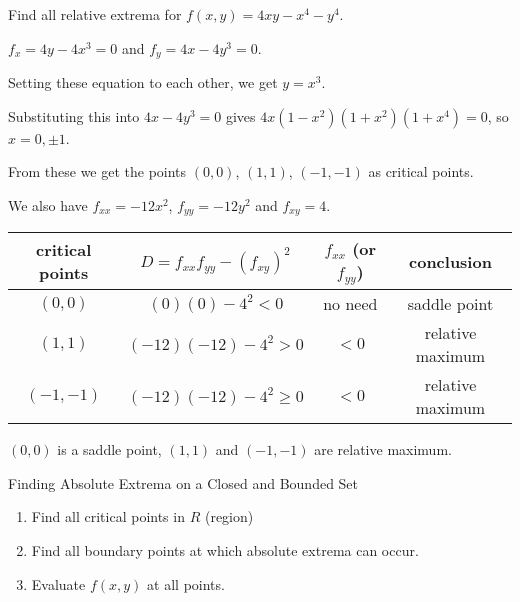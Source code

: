 \documentclass[../calc3.tex]{subfiles}
\begin{document}
\begin{example}
    Find all relative extrema for $f(x,y)=4xy-x^4-y^4$.

    $f_x=4y-4x^3=0$ and $f_y=4x-4y^3=0$.

    Setting these equation to each other, we get $y=x^3$.

    Substituting this into $4x-4y^3=0$ gives $4x(1-x^2)(1+x^2)(1+x^4)=0$, so $x=0, \pm 1$.

    From these we get the points $(0,0)$, $(1,1)$, $(-1,-1)$ as critical points.

    We also have $f_{xx}=-12x^2$, $f_{yy}=-12y^2$ and $f_{xy}=4$.
\begin{center}
    \begin{tabular}{c|c|c|c}
        critical points & $D=f_{xx}f_{yy}-(f_{xy})^2$ & $f_{xx}$ (or $f_{yy}$) & conclusion\\\hline 
        $(0,0)$ & $(0)(0)-4^2 < 0$ & no need & saddle point \\
        $(1,1)$ & $(-12)(-12)-4^2 > 0$ & $<0$ & relative maximum \\
        $(-1,-1)$ & $(-12)(-12)-4^2\geq 0$ & $<0$ & relative maximum 
    \end{tabular}
\end{center}

    $(0,0)$ is a saddle point, $(1,1)$ and $(-1,-1)$ are relative maximum.
\end{example}

Finding Absolute Extrema on a Closed and Bounded Set 
\begin{enumerate}
    \item Find all critical points in $R$ (region)
    \item Find all boundary points at which absolute extrema can occur.
    \item Evaluate $f(x,y)$ at all points.
\end{enumerate}
\end{document}
